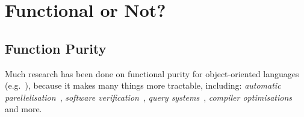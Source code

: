 \newpage
\section{Functional or Not?}



\subsection{Function Purity}
Much research has been done on functional purity for object-oriented
languages (e.g.~\cite{Pea11,Rou04,SR05,MRR02}), because it makes 
many things more tractable, including: {\em automatic
 parellelisation}~\cite{ABCR10,CRPAHBW10}, {\em software
 verification}~\cite{Leav02,BNSS04,BA05,DL07}, {\em query
 systems}~\cite{LHS97,WPN08}, {\em compiler
 optimisations}~\cite{Cla97,LLH05,ZRKW08} and more.
